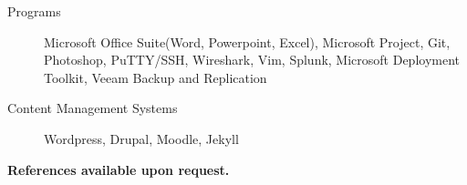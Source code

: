 \documentclass{article}
\begin{document}
\begin{samepage}
\begin{description}
\item[Programs] Microsoft Office Suite(Word, Powerpoint, Excel), Microsoft Project, Git, Photoshop, PuTTY/SSH, Wireshark, Vim, Splunk, Microsoft Deployment Toolkit, Veeam Backup and Replication
\item[Content Management Systems] Wordpress, Drupal, Moodle, Jekyll
\end{description}


\begin{center}
\textbf{References available upon request.}
\end{center}

\thispagestyle{empty}
\end{samepage}
\end{document}
